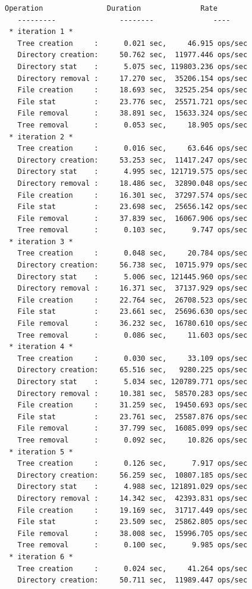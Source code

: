 \documentclass[conference,compsoc]{IEEEtran}
\begin{document}
\begin{lstlisting}
Operation               Duration              Rate
   ---------               --------              ----
 * iteration 1 *
   Tree creation     :      0.021 sec,     46.915 ops/sec
   Directory creation:     50.762 sec,  11977.446 ops/sec
   Directory stat    :      5.075 sec, 119803.236 ops/sec
   Directory removal :     17.270 sec,  35206.154 ops/sec
   File creation     :     18.693 sec,  32525.254 ops/sec
   File stat         :     23.776 sec,  25571.721 ops/sec
   File removal      :     38.891 sec,  15633.324 ops/sec
   Tree removal      :      0.053 sec,     18.905 ops/sec
 * iteration 2 *
   Tree creation     :      0.016 sec,     63.646 ops/sec
   Directory creation:     53.253 sec,  11417.247 ops/sec
   Directory stat    :      4.995 sec, 121719.575 ops/sec
   Directory removal :     18.486 sec,  32890.048 ops/sec
   File creation     :     16.301 sec,  37297.574 ops/sec
   File stat         :     23.698 sec,  25656.142 ops/sec
   File removal      :     37.839 sec,  16067.906 ops/sec
   Tree removal      :      0.103 sec,      9.747 ops/sec
 * iteration 3 *
   Tree creation     :      0.048 sec,     20.784 ops/sec
   Directory creation:     56.738 sec,  10715.979 ops/sec
   Directory stat    :      5.006 sec, 121445.960 ops/sec
   Directory removal :     16.371 sec,  37137.929 ops/sec
   File creation     :     22.764 sec,  26708.523 ops/sec
   File stat         :     23.661 sec,  25696.630 ops/sec
   File removal      :     36.232 sec,  16780.610 ops/sec
   Tree removal      :      0.086 sec,     11.603 ops/sec
 * iteration 4 *
   Tree creation     :      0.030 sec,     33.109 ops/sec
   Directory creation:     65.516 sec,   9280.225 ops/sec
   Directory stat    :      5.034 sec, 120789.771 ops/sec
   Directory removal :     10.381 sec,  58570.283 ops/sec
   File creation     :     31.259 sec,  19450.693 ops/sec
   File stat         :     23.761 sec,  25587.876 ops/sec
   File removal      :     37.799 sec,  16085.099 ops/sec
   Tree removal      :      0.092 sec,     10.826 ops/sec
 * iteration 5 *
   Tree creation     :      0.126 sec,      7.917 ops/sec
   Directory creation:     56.259 sec,  10807.185 ops/sec
   Directory stat    :      4.988 sec, 121891.029 ops/sec
   Directory removal :     14.342 sec,  42393.831 ops/sec
   File creation     :     19.169 sec,  31717.449 ops/sec
   File stat         :     23.509 sec,  25862.805 ops/sec
   File removal      :     38.008 sec,  15996.705 ops/sec
   Tree removal      :      0.100 sec,      9.985 ops/sec
 * iteration 6 *
   Tree creation     :      0.024 sec,     41.264 ops/sec
   Directory creation:     50.711 sec,  11989.447 ops/sec

\end{lstlisting}
\end{document}
